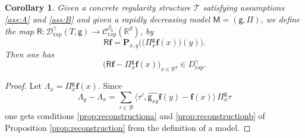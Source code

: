 \documentclass[JEP,XML,SOM,Unicode,published]{cedram}
\theoremstyle{plain}
\newtheorem{cor}[thm]{Corollary}
\theoremstyle{definition}
\newcommand{\bsf}{\boldsymbol{f}}
\newcommand{\rap}{\mathrm{rap}}
\newcommand{\bfP}{\mathbf{P}}
\newcommand{\reR}{\boldsymbol{\mathsf{R}}}
\newcommand{\sfM}{\mathsf{M}}
\newcommand{\sfg}{\mathsf{g}}
\newcommand{\sfPi}{\mathsf{\Pi}}
\newcommand{\scrT}{\mathscr{T}}
\newcommand{\bbR}{\mathbb{R}}
\newcommand{\mcB}{\mathcal{B}}
\newcommand{\mcC}{\mathcal{C}}
\newcommand{\mcD}{\mathcal{D}}
\begin{document}
\begin{cor}\label{canonical reconstruction}
Given a concrete regularity structure $\scrT$ satisfying assumptions \eqref{ass:A} and \eqref{ass:B} and given a rapidly decreasing model $\sfM=(\sfg,\sfPi)$, we define the map \hbox{$\reR : \mcD_\rap^\gamma(T,\sfg)\to \mcC_\rap^{\beta_0}(\bbR^d)$}, by
\[
\reR\bsf = \bfP_{x,y}\bigl(\bigl(\sfPi_x^\sfg\bsf(x)\bigr)(y)\bigr).
\]
Then one has
\[
\bigl(\reR\bsf-\sfPi_x^\sfg\bsf(x)\bigr)_{x\in\bbR^d} \in D_\rap^\gamma.
\]
\end{cor}

\begin{proof}
Let $\Lambda_x=\sfPi_x^\sfg\bsf(x)$. Since
\[
\Lambda_y-\Lambda_x = \sum_{\tau\in\mcB} \big\langle\tau',\widehat{\sfg_{xy}}\bsf(y)-\bsf(x)\big\rangle\,\sfPi_x^\sfg\tau
\]
one gets conditions \eqref{prop:reconstructiona} and \eqref{prop:reconstructionb} of Proposition \ref{prop:reconstruction} from the definition of a model.
\end{proof}
\end{document}
